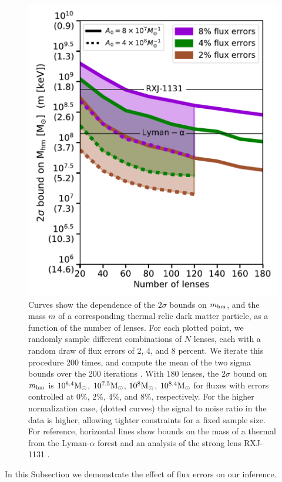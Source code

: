 \begin{figure}
	\centering
	\includegraphics[clip,trim=0cm 0cm 0cm
	0cm,width=.75\textwidth,keepaspectratio]{./figures_ABCforward/nlens_vs_2sigma.pdf}
	\caption{\label{fig:nlens_vs_2sigma} Curves show the dependence of the $2\sigma$ bounds on $m_{\rm{hm}}$, and the mass $m$ of a corresponding thermal relic dark matter particle, as a function of the number of lenses. For each plotted point, we randomly sample different combinations of $N$ lenses, each with a random draw of flux errors of 2, 4, and 8 percent. We iterate this procedure 200 times, and compute the mean of the two sigma bounds over the 200 iterations . %
		With 180 lenses, the $2\sigma$ bound on $m_{\rm{hm}}$ is $10^{6.4} {\rm{M}_{\odot}}$, $10^{7.5} {\rm{M}_{\odot}}$, $10^{8} {\rm{M}_{\odot}}$, $10^{8.4} {\rm{M}_{\odot}}$ for fluxes with errors controlled at $0\%$, $2\%$, $4\%$, and $8\%$, respectively. For the higher normalization case, (dotted curves) the signal to noise ratio in the data is higher, allowing tighter constraints for a fixed sample size. For reference, horizontal lines show bounds on the mass of a thermal from the Lyman-$\alpha$ forest \cite{Viel13} and an analysis of the strong lens RXJ-1131 \cite{Birrer++17a}.}
\end{figure}

In this Subsection we demonstrate the effect of flux errors on our inference.

